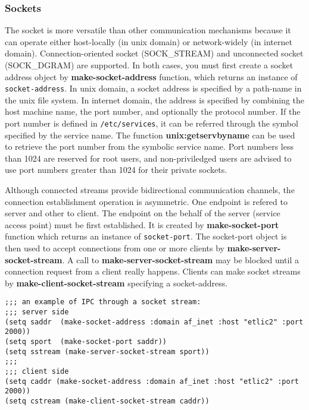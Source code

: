 \subsubsection{Sockets}
The socket is more versatile than other communication mechanisms
because it can operate either host-locally (in unix domain) or
network-widely (in internet domain).
Connection-oriented socket (SOCK\_STREAM) and
unconnected socket (SOCK\_DGRAM) are supported.
In both cases,
you must first create a socket address object
by {\bf make-socket-address} function,
which returns an instance of {\tt socket-address}.
In unix domain, a socket address is specified by a path-name
in the unix file system.
In internet domain, the address is specified by combining
the host machine name, the port number, and optionally the protocol number.
If the port number is defined in {\tt /etc/services}, it can be referred through
the symbol specified by the service name.
The function {\bf unix:getservbyname} can be used 
to retrieve the port number from the symbolic service name.
Port numbers less than 1024 are reserved for root users,
and non-priviledged users are advised to use port numbers greater than 1024 
for their private sockets.

Although connected streams provide bidirectional communication channels,
the connection establishment operation is asymmetric.
One endpoint is refered
to server and other to client.
The endpoint on the behalf of the server
(service access point) must be first established.
It is created by {\bf make-socket-port} function which returns an instance
of {\tt socket-port}.
The socket-port object is then used to accept connections from
one or more clients by {\bf make-server-socket-stream}.
A call to {\bf make-server-socket-stream} may be blocked
until a connection request from a client really happens.
Clients can make socket streams by
{\bf make-client-socket-stream} specifying a socket-address.

\begin{verbatim}
;;; an example of IPC through a socket stream:
;;; server side
(setq saddr  (make-socket-address :domain af_inet :host "etlic2" :port 2000))
(setq sport  (make-socket-port saddr))
(setq sstream (make-server-socket-stream sport))
;;;
;;; client side
(setq caddr (make-socket-address :domain af_inet :host "etlic2" :port 2000))
(setq cstream (make-client-socket-stream caddr))
\end{verbatim}

